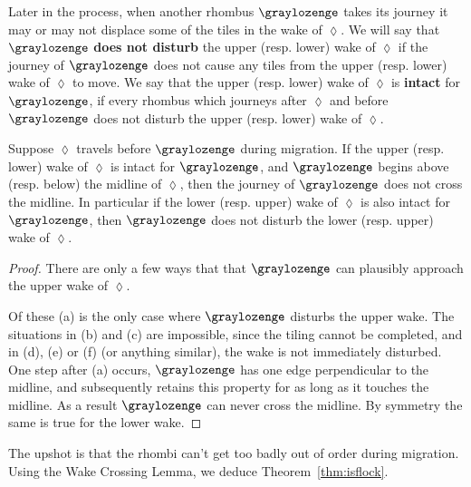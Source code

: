 Later in the process, when another rhombus $\graylozenge$ takes
its journey it may or may not displace some of the tiles in the 
wake of $\lozenge$.  We will say that $\graylozenge$
{\bf does not disturb} the upper (resp. lower) wake of $\lozenge$
if the journey of $\graylozenge$ does not cause any tiles from
the upper (resp. lower) wake of $\lozenge$ to move.  
We say that the upper (resp. lower) wake of $\lozenge$ is
{\bf intact} for $\graylozenge$, if every rhombus which journeys
after $\lozenge$ and before $\graylozenge$ does not disturb the
upper (resp. lower) wake of $\lozenge$.  

\begin{wclemma}
Suppose $\lozenge$ travels before $\graylozenge$ during migration.
If the upper (resp. lower) wake of $\lozenge$ is intact for 
$\graylozenge$, and $\graylozenge$ begins above (resp. below) the midline 
of $\lozenge$, then the journey of $\graylozenge$ does not cross
the midline.  In particular if the lower (resp. upper) wake
of $\lozenge$ is also intact for $\graylozenge$, then $\graylozenge$
does not disturb the lower (resp. upper) wake of $\lozenge$.
\end{wclemma}

\begin{proof}
There are only a few ways that 
that $\graylozenge$ can plausibly approach the upper wake 
of $\lozenge$.
\begin{center}
\end{center}
Of these (a) is the only case where $\graylozenge$ disturbs the
upper wake.  The situations in (b) and (c) are impossible, since
the tiling cannot be completed, and in (d), (e) or (f) (or anything
similar), the wake is not immediately disturbed.
One step after (a) occurs, $\graylozenge$ has one edge perpendicular
to the midline, and subsequently retains this property for as long as 
it touches the midline.  As a result $\graylozenge$
can never cross the midline. By symmetry the same is true for the lower wake.
\end{proof}

The upshot is that the rhombi can't get too badly out
of order during migration.  Using the Wake Crossing Lemma,
we deduce Theorem~\ref{thm:isflock}.

